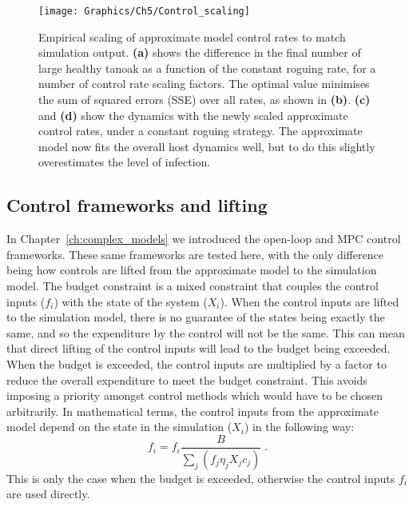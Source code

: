 \begin{figure}[h]
    \begin{center}
        \texttt{[image: Graphics/Ch5/Control\_scaling]}
        \caption[Scaling of control rates]{Empirical scaling of approximate model control rates to match simulation output. \textbf{(a)} shows the difference in the final number of large healthy tanoak as a function of the constant roguing rate, for a number of control rate scaling factors. The optimal value minimises the sum of squared errors (SSE) over all rates, as shown in \textbf{(b)}. \textbf{(c)} and \textbf{(d)} show the dynamics with the newly scaled approximate control rates, under a constant roguing strategy. The approximate model now fits the overall host dynamics well, but to do this slightly overestimates the level of infection. \label{fig:ch5:control_scaling}}
    \end{center}
\end{figure}

\subsection{Control frameworks and lifting}

In Chapter~\ref{ch:complex_models} we introduced the open-loop and MPC control frameworks. These same frameworks are tested here, with the only difference being how controls are lifted from the approximate model to the simulation model. The budget constraint is a mixed constraint that couples the control inputs ($f_i$) with the state of the system ($X_i$). When the control inputs are lifted to the simulation model, there is no guarantee of the states being exactly the same, and so the expenditure by the control will not be the same. This can mean that direct lifting of the control inputs will lead to the budget being exceeded. When the budget is exceeded, the control inputs are multiplied by a factor to reduce the overall expenditure to meet the budget constraint. This avoids imposing a priority amongst control methods which would have to be chosen arbitrarily. In mathematical terms, the control inputs from the approximate model depend on the state in the simulation ($X_i$) in the following way:
\begin{equation}
    f_i = f_i\frac{B}{\sum_j\left(f_j\eta_jX_jc_j\right)}\;.
\end{equation}
This is only the case when the budget is exceeded, otherwise the control inputs $f_i$ are used directly. 

